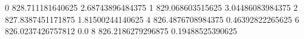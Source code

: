 0 828.711181640625 2.68743896484375
1 829.068603515625 3.04486083984375
2 827.8387451171875 1.81500244140625
4 826.4876708984375 0.46392822265625
6 826.0237426757812 0.0
8 826.2186279296875 0.19488525390625
